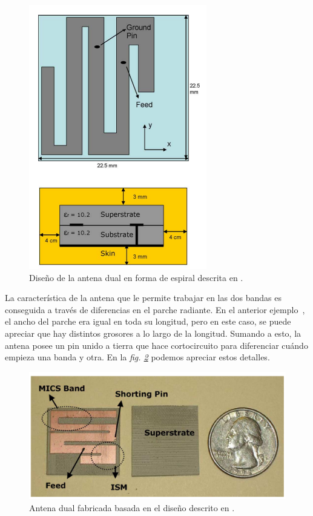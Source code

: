 \begin{figure}[!htb]
    \centering
    \includegraphics[scale=0.25]{./ContextoTecnologico/articulos/kara1}
    \caption{Diseño de la antena dual en forma de espiral descrita en \cite{karacola}.}
    \label{fig:fig2.15}
\end{figure}

\clearpage

La característica de la antena que le permite trabajar en las dos bandas es conseguida a través de diferencias en el parche radiante. En el anterior ejemplo~\cite{kim}, el ancho del parche era igual en toda su longitud, pero en este caso, se puede apreciar que hay distintos grosores a lo largo de la longitud. Sumando a esto, la antena posee un pin unido a tierra que hace cortocircuito para diferenciar cuándo empieza una banda y otra. En la \textit{fig. \ref{fig:fig2.16}} podemos apreciar estos detalles.

\begin{figure}[!htb]
    \centering
    \includegraphics[scale=0.4]{./ContextoTecnologico/articulos/kara2}
    \caption{Antena dual fabricada basada en el diseño descrito en \cite{karacola}.}
    \label{fig:fig2.16}
\end{figure}

